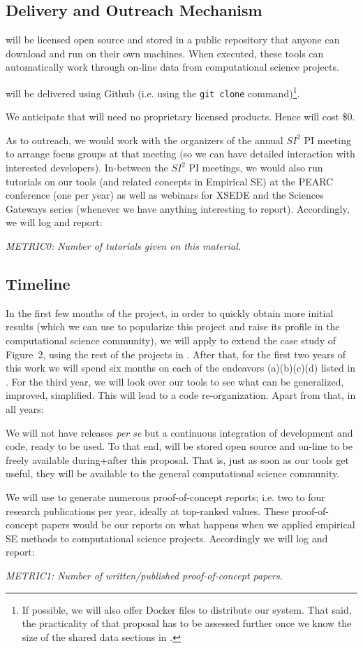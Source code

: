\subsection{Delivery and Outreach Mechanism}\label{tion:outreach}  {\IT} will
be licensed
open source and
stored in a public
 repository
 that anyone can download and run on their own machines. When executed, these tools
can automatically  work through on-line data from computational science projects.  


{\IT}
will be delivered using Github (i.e. using the
{\tt git clone} command)\footnote{If possible, we will also offer Docker files to distribute our system.
That said, the practicality
of that proposal has to be assessed further once we know the size of the shared data sections
in {\IT}.}. 

We anticipate  that {\IT} will need no proprietary licensed products. Hence  {\IT}
will cost \$0.


As to outreach,
 we would work with the organizers of the annual $SI^2$ PI meeting to arrange focus groups at that meeting
 (so we can have detailed  interaction with interested developers).
In-between the $SI^2$ PI meetings, we would also 
run tutorials on our tools (and related concepts in Empirical SE)
at the PEARC conference (one per year)
as well as webinars
for XSEDE  
and the Sciences Gateways series (whenever we have anything interesting to report).
Accordingly, we will log and report:
\bi
\item {\em METRIC0: Number of tutorials given on this material.}
\ei

\subsection{Timeline}
In the first few months of the project, in order to quickly obtain more initial results (which we can use to popularize this project
and raise its profile in the computational science community), we will apply {\IT} to extend the case study of Figure~2, using the rest of the projects in .
After that, for the first two years of this work we will spend six months on each
of the endeavors (a)(b)(c)(d) listed in . 
For the third year, we will look over our tools to see what can be generalized, improved, simplified. This will lead to a code re-organization.
Apart from that, in all years:
\bi
\item
We will not have releases {\em per se} but a continuous integration
of development and code, ready to be used.
To that end, {\IT}
will be stored open source and on-line to be freely available during+after
this proposal. That is,  just as soon as our tools get useful, they will be
available to the general computational science community.
\item
We will use {\IT} to generate numerous proof-of-concept reports;
i.e. two to four research publications per year, ideally
at top-ranked values.
These proof-of-concept papers would be our reports on what happens when we applied 
empirical SE methods to computational science projects. 
\ei
Accordingly we will log and report:
\bi
\item {\em METRIC1: Number of written/published proof-of-concept papers.}
\ei
